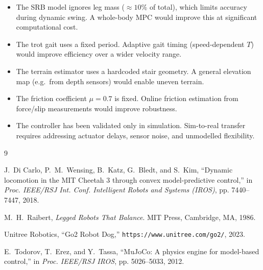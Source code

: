 \documentclass[12pt,a4paper]{report}
\begin{document}
\begin{itemize}[noitemsep]
    \item The SRB model ignores leg mass ($\approx 10\%$ of total), which
          limits accuracy during dynamic swing.  A whole-body MPC would improve
          this at significant computational cost.
    \item The trot gait uses a fixed period.  Adaptive gait timing (speed-dependent
          $T$) would improve efficiency over a wider velocity range.
    \item The terrain estimator uses a hardcoded stair geometry.  A general
          elevation map (e.g.\ from depth sensors) would enable uneven terrain.
    \item The friction coefficient $\mu = 0.7$ is fixed.  Online friction
          estimation from force/slip measurements would improve robustness.
    \item The controller has been validated only in simulation.  Sim-to-real
          transfer requires addressing actuator delays, sensor noise, and
          unmodelled flexibility.
\end{itemize}


\begin{thebibliography}{9}

J.~Di Carlo, P.~M.~Wensing, B.~Katz, G.~Bledt, and S.~Kim,
``Dynamic locomotion in the MIT Cheetah 3 through convex model-predictive control,''
in \textit{Proc. IEEE/RSJ Int. Conf. Intelligent Robots and Systems (IROS)},
pp. 7440--7447, 2018.

M.~H.~Raibert,
\textit{Legged Robots That Balance}.
MIT Press, Cambridge, MA, 1986.

Unitree Robotics,
``Go2 Robot Dog,''
\texttt{https://www.unitree.com/go2/}, 2023.

E.~Todorov, T.~Erez, and Y.~Tassa,
``MuJoCo: A physics engine for model-based control,''
in \textit{Proc. IEEE/RSJ IROS}, pp. 5026--5033, 2012.

\end{thebibliography}
\end{document}
